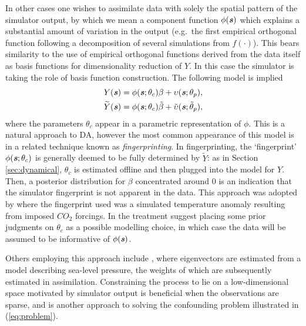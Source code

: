 \documentclass[10pt,a4paper]{article}
\newcommand{\svec} {\textbf{\textit{s}}}
\begin{document}
In other cases one wishes to assimilate data with solely the spatial pattern of the simulator output, by which we mean a component function $\phi(\svec)$ which explains a substantial amount of variation in the output (e.g.~the first empirical orthogonal function following a decomposition of several simulations from $f(\cdot)$). This bears similarity to the use of empirical orthogonal functions derived from the data itself \citep[e.g.][]{Wikle_1999} as basis functions for dimensionality reduction of $Y$. In this case the simulator is taking the role of basis function construction. The following model is implied
\begin{align}
Y(\svec) &= \phi(\svec ; \theta_c) \beta + \upsilon(\svec;\theta_p), \\
\widetilde Y(\svec) &= \phi(\svec ; \theta_c) \tilde\beta + \tilde\upsilon(\svec;\tilde\theta_p),
\end{align}
\noindent where the parameters $\theta_c$ appear in a parametric representation of $\phi$. This is a natural approach to DA, however the most common appearance of this model is in a related technique known as \emph{fingerprinting}. In fingerprinting, the `fingerprint' $\phi(\svec; \theta_c)$ is generally deemed to be fully determined by $\widetilde Y$: as in Section \ref{sec:dynamical}, $\theta_c$ is estimated offline and then plugged into the model for $Y$. Then, a posterior distribution for $\beta$ concentrated around 0 is an indication that the simulator fingerprint is not apparent in the data. This approach was adopted by \cite{Berliner_2000} where the fingerprint used was a simulated temperature anomaly resulting from imposed $CO_2$ forcings. In the treatment \cite{Berliner_2000} suggest placing some prior judgments on $\theta_c$ as a possible modelling choice, in which case the data will be assumed to be informative of $\phi(\svec)$.

Others employing this approach include \cite{Wikle_2001}, where eigenvectors are estimated from a model describing sea-level pressure, the weights of which are subsequently estimated in assimilation. Constraining the process to lie on a low-dimensional space motivated by simulator output is beneficial when the observations are sparse, and is another approach to solving the confounding problem illustrated in (\ref{eq:problem}).
\end{document}
